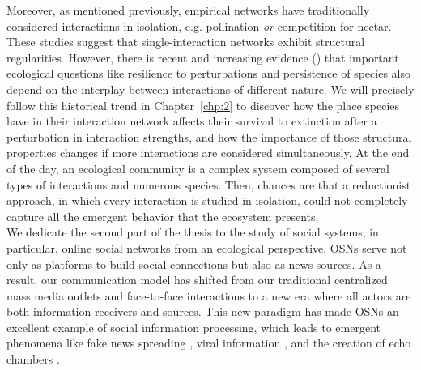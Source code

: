 Moreover, as mentioned previously, empirical networks  have  traditionally  considered interactions in isolation, e.g. pollination \textit{or} competition for nectar. These studies suggest that single-interaction networks exhibit structural regularities. However, there is recent and increasing evidence (\cite{kefi2012more, kefi2016structured,dominguez2021structure, Garcia-Callejas2018ThePersistence, Garcia-Callejas2021TheConstraints}) that important ecological questions like resilience to perturbations and persistence of species also depend on the interplay between interactions of different nature. We will precisely follow this historical trend in Chapter~\ref{chp:2} to discover how the place species have in their interaction network affects their survival to extinction after a perturbation in interaction strengths, and how the importance of those structural properties changes if more interactions are considered simultaneously. At the end of the day, an ecological community is a complex system composed of several types of interactions and numerous species. Then, chances are that a reductionist approach, in which every interaction is studied in isolation, could not completely capture all the emergent behavior that the ecosystem presents. \\

We dedicate the second part of the thesis to the study of social systems, in particular, online social networks from an ecological perspective.  OSNs serve not only as platforms to build social connections but also as news sources. As a result, our communication model has shifted from our traditional centralized mass media outlets and face-to-face interactions to a new era where all actors are both information receivers and sources. This new paradigm has made OSNs an excellent example of social information processing, which leads to emergent phenomena like fake news spreading \cite{del2016spreading}, viral information  \cite{weng2013virality}, and the creation of echo chambers \cite{del2016echo, cota2019echo}.\\


